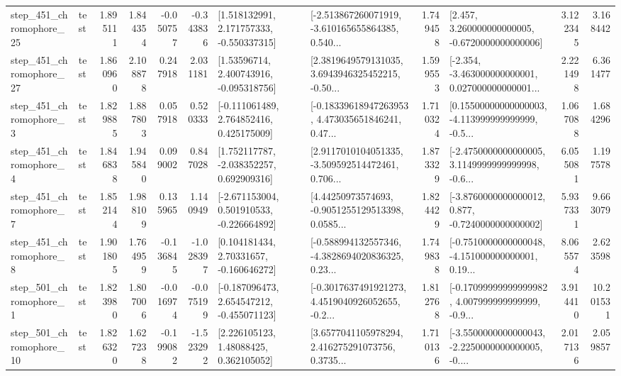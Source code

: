 \begin{tabular}{llrrrrllrlrr}
  step\_451\_chromophore\_25 &      test &      1.895111 &    1.844354 &     -0.050757 & -0.343836 &    [1.518132991, 2.171757333, -0.550337315] &  [-2.513867260071919, -3.610165655864385, 0.540... &       1.749458 &    [2.457, 3.260000000000005, -0.6720000000000006] &            3.122345 &          3.168442 \\
  step\_451\_chromophore\_27 &      test &      1.860960 &    2.108878 &      0.247918 &  2.031181 &     [1.53596714, 2.400743916, -0.095318756] &  [2.3819649579131035, 3.6943946325452215, -0.50... &       1.599553 &  [-2.354, -3.463000000000001, 0.027000000000001... &            2.221498 &          6.361477 \\
   step\_451\_chromophore\_3 &      test &      1.829885 &    1.887803 &      0.057918 &  0.520333 &    [-0.111061489, 2.764852416, 0.425175009] &  [-0.18339618947263953, 4.473035651846241, 0.47... &       1.710324 &  [0.15500000000000003, -4.113999999999999, -0.5... &            1.067088 &          1.684296 \\
   step\_451\_chromophore\_4 &      test &      1.846838 &    1.945840 &      0.099002 &  0.847028 &    [1.752117787, -2.038352257, 0.692909316] &  [2.9117010104051335, -3.509592514472461, 0.706... &       1.873329 &  [-2.4750000000000005, 3.1149999999999998, -0.6... &            6.055081 &          1.197578 \\
   step\_451\_chromophore\_7 &      test &      1.852144 &    1.988109 &      0.135965 &  1.140949 &   [-2.671153004, 0.501910533, -0.226664892] &  [4.44250973574693, -0.9051255129513398, 0.0585... &       1.824429 &  [-3.8760000000000012, 0.877, -0.7240000000000002] &            5.937331 &          9.663079 \\
   step\_451\_chromophore\_8 &      test &      1.901805 &    1.764959 &     -0.136845 & -1.028397 &     [0.104181434, 2.70331657, -0.160646272] &  [-0.588994132557346, -4.3828694020836325, 0.23... &       1.749838 &  [-0.7510000000000048, -4.151000000000001, 0.19... &            8.065574 &          2.623598 \\
   step\_501\_chromophore\_1 &      test &      1.823980 &    1.807006 &     -0.016974 & -0.075199 &   [-0.187096473, 2.654547212, -0.455071123] &  [-0.3017637491921273, 4.4519040926052655, -0.2... &       1.812768 &  [-0.17099999999999982, 4.007999999999999, -0.9... &            3.914410 &         10.201531 \\
  step\_501\_chromophore\_10 &      test &      1.826320 &    1.627238 &     -0.199082 & -1.523292 &      [2.226105123, 1.48088425, 0.362105052] &  [3.6577041105978294, 2.416275291073756, 0.3735... &       1.710136 &  [-3.5500000000000043, -2.2250000000000005, -0.... &            2.017136 &          2.059857 \\

\end{tabular}
